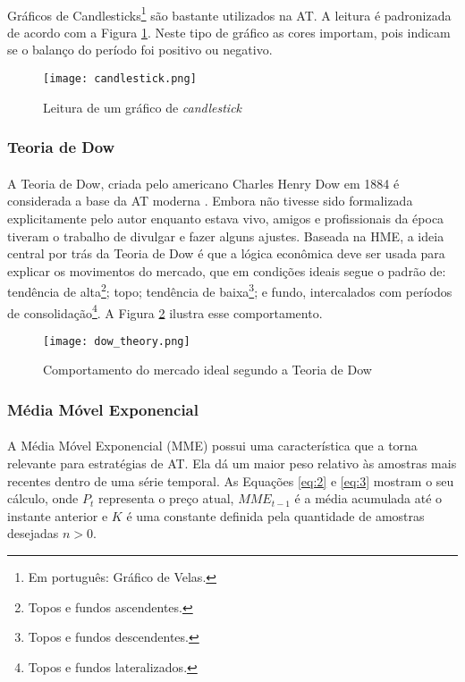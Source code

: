 \paragraph{} Gráficos de Candlesticks\footnote{Em português: Gráfico de Velas.} são bastante utilizados na AT. A leitura é padronizada de acordo com a Figura \ref{fig:1}. Neste tipo de gráfico as cores importam, pois indicam se o balanço do período foi positivo ou negativo.

\begin{figure}[h]
    \texttt{[image: candlestick.png]}
    \centering
    \caption{Leitura de um gráfico de \textit{candlestick} \cite{candlestick}}
    \label{fig:1}
\end{figure}

\subsubsection*{Teoria de Dow}

\paragraph{} A Teoria de Dow, criada pelo americano Charles Henry Dow em 1884 é considerada a base da AT moderna \cite{kirkpatrick2010technical}. Embora não tivesse sido formalizada explicitamente pelo autor enquanto estava vivo, amigos e profissionais da época tiveram o trabalho de divulgar e fazer alguns ajustes. Baseada na HME, a ideia central por trás da Teoria de Dow é que a lógica econômica deve ser usada para explicar os movimentos do mercado, que em condições ideais segue o padrão de: tendência de alta\footnote{Topos e fundos ascendentes.}; topo; tendência de baixa\footnote{Topos e fundos descendentes.}; e fundo, intercalados com períodos de consolidação\footnote{Topos e fundos lateralizados.}. A Figura \ref{fig:2} ilustra esse comportamento.

\begin{figure}[h]
    \texttt{[image: dow\_theory.png]}
    \centering
    \caption{Comportamento do mercado ideal segundo a Teoria de Dow \cite{kirkpatrick2010technical}}
    \label{fig:2}
\end{figure}

\subsubsection*{Média Móvel Exponencial}

\paragraph{} A Média Móvel Exponencial (MME) possui uma característica que a torna relevante para estratégias de AT. Ela dá um maior peso relativo às amostras mais recentes dentro de uma série temporal. As Equações \ref{eq:2} e \ref{eq:3} mostram o seu cálculo, onde $P_t$ representa o preço atual, $\mathit{MME_{t-1}}$ é a média acumulada até o instante anterior e $K$ é uma constante definida pela quantidade de amostras desejadas $n>0$.

